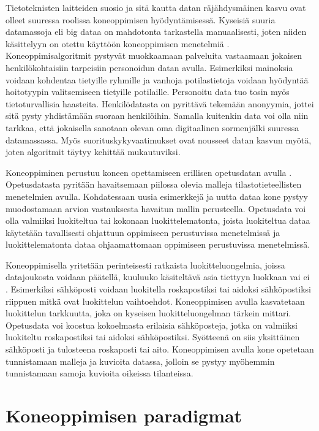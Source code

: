 \documentclass[utf8]{gradu3}
\begin{document}
Tietoteknisten laitteiden suosio ja sitä kautta datan räjähdysmäinen kasvu ovat olleet suuressa roolissa koneoppimisen hyödyntämisessä. Kyseisiä suuria datamassoja eli big dataa on mahdotonta tarkastella manuaalisesti, joten niiden käsittelyyn on otettu käyttöön koneoppimisen menetelmiä \parencite{jordan2015machine}. Koneoppimisalgoritmit pystyvät muokkaamaan palveluita vastaamaan jokaisen henkilökohtaisiin tarpeisiin personoidun datan avulla. Esimerkiksi mainoksia voidaan kohdentaa tietyille ryhmille ja vanhoja potilastietoja voidaan hyödyntää hoitotyypin valitsemiseen tietyille potilaille. Personoitu data tuo tosin myös tietoturvallisia haasteita. Henkilödatasta on pyrittävä tekemään anonyymia, jottei sitä pysty yhdistämään suoraan henkilöihin. Samalla kuitenkin data voi olla niin tarkkaa, että jokaisella sanotaan olevan oma digitaalinen sormenjälki suuressa datamassassa. Myös suorituskykyvaatimukset ovat nousseet datan kasvun myötä, joten algoritmit täytyy kehittää mukautuviksi.

Koneoppiminen perustuu koneen opettamiseen erillisen opetusdatan avulla \parencite{das2017survey,jordan2015machine}. Opetusdatasta pyritään havaitsemaan piilossa olevia malleja tilastotieteellisten menetelmien avulla. Kohdatessaan uusia esimerkkejä ja uutta dataa kone pystyy muodostamaan arvion vastauksesta havaitun mallin perusteella. Opetusdata voi olla valmiiksi luokiteltua tai kokonaan luokittelematonta, joista luokiteltua dataa käytetään tavallisesti ohjattuun oppimiseen perustuvissa menetelmissä ja luokittelematonta dataa ohjaamattomaan oppimiseen perustuvissa menetelmissä.

Koneoppimisella yritetään perinteisesti ratkaista luokitteluongelmia, joissa datajoukosta voidaan päätellä, kuuluuko käsiteltävä asia tiettyyn luokkaan vai ei \parencite{jordan2015machine}. Esimerkiksi sähköposti voidaan luokitella roskapostiksi tai aidoksi sähköpostiksi riippuen mitkä ovat luokittelun vaihtoehdot. Koneoppimisen avulla kasvatetaan luokittelun tarkkuutta, joka on kyseisen luokitteluongelman tärkein mittari. Opetusdata voi koostua kokoelmasta erilaisia sähköposteja, jotka on valmiiksi luokiteltu roskapostiksi tai aidoksi sähköpostiksi. Syötteenä on siis yksittäinen sähköposti ja tulosteena roskaposti tai aito. Koneoppimisen avulla kone opetetaan tunnistamaan malleja ja kuvioita datassa, jolloin se pystyy myöhemmin tunnistamaan samoja kuvioita oikeissa tilanteissa.

\section{Koneoppimisen paradigmat}
\end{document}
